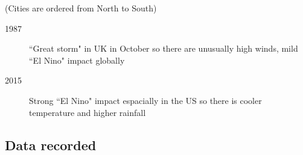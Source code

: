 (Cities are ordered from North to South)

\begin{description}
    \item[1987] ``Great storm" in UK in October so there are unusually high winds, mild ``El Nino" impact globally
    \item[2015] Strong ``El Nino" impact espacially in the US so there is cooler temperature and higher rainfall
\end{description}

\subsection{Data recorded}
